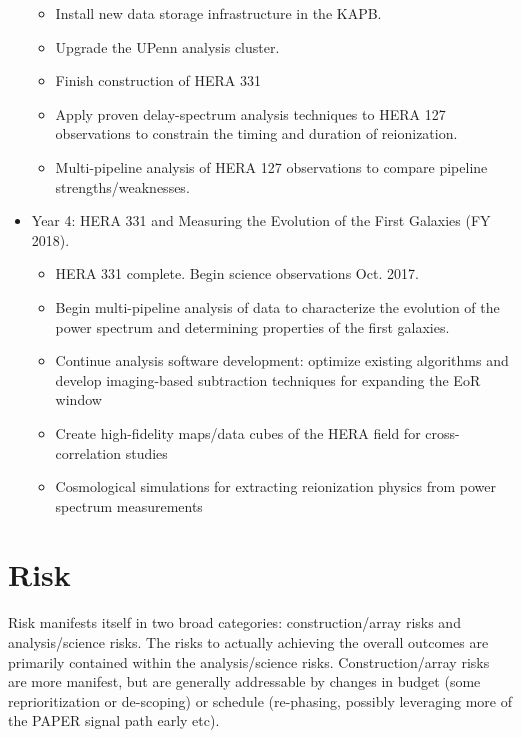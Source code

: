 \documentclass[preprint]{aastex}
\begin{document}
\begin{itemize}[itemsep=-4pt,parsep=-3pt]
\begin{itemize}[itemsep=-4pt]
\item Install new data storage infrastructure in the KAPB. 
\item Upgrade the UPenn analysis cluster. 
\item Finish construction of HERA 331
\item Apply proven delay-spectrum analysis techniques to HERA 127 observations to constrain the timing and duration of reionization. 
\item Multi-pipeline analysis of HERA 127 observations to compare pipeline strengths/weaknesses.
\end{itemize}
\item Year 4:  HERA 331 and Measuring the Evolution of the First Galaxies (FY 2018). 
\begin{itemize}[itemsep=-4pt]
\item HERA 331 complete. Begin science observations Oct. 2017. 
\item Begin multi-pipeline analysis of data to characterize the evolution of the power spectrum and determining properties of the first galaxies. 
\item Continue analysis software development: optimize existing algorithms and develop imaging-based subtraction techniques for expanding the EoR window
\item Create high-fidelity maps/data cubes of the HERA field for cross-correlation studies
\item Cosmological simulations for extracting reionization physics from power spectrum measurements
\end{itemize}
\end{itemize}


\section{Risk}
\label{sec:risk}
Risk manifests itself in two broad categories: construction/array risks and
analysis/science risks. The risks to actually achieving the overall outcomes are
primarily contained within the analysis/science risks. Construction/array risks are
more manifest, but are generally addressable by changes in budget (some
reprioritization or de-scoping) or schedule (re-phasing, possibly leveraging more of
the PAPER signal path early etc).
\end{document}
